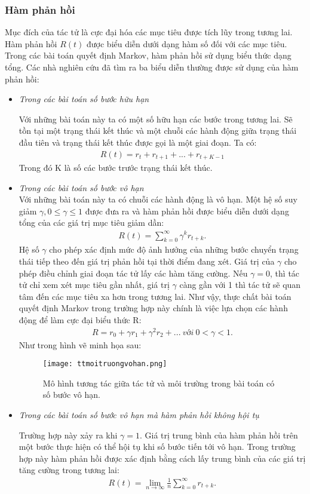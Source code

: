 \subsubsection{Hàm phản hồi}
Mục đích của tác tử là cực đại hóa các mục tiêu được tích lũy trong tương lai. Hàm phản hồi $R(t)$ được biểu diễn dưới dạng hàm số đối với các mục tiêu. Trong các bài toán quyết định Markov, hàm phản hồi sử dụng biểu thức dạng tổng. Các nhà nghiên cứu đã tìm ra ba biểu diễn thường được sử dụng của hàm phản hồi:
\begin{itemize}
\item \textit{Trong các bài toán số bước hữu hạn}

Với những bài toán này ta có một số hữu hạn các bước trong tương lai. Sẽ tồn tại một trạng thái kết thúc và một chuỗi các hành động giữa trạng thái đầu tiên và trạng thái kết thúc được gọi là một giai đoạn.
Ta có:
\begin{align*}
R(t)=r_{t}+r_{t+1}+...+r_{t+K-1}
\end{align*}
	Trong đó K là số các bước trước trạng thái kết thúc.
\item \textit{Trong các bài toán số bước vô hạn}\\
	Với những bài toán này ta có chuỗi các hành động là vô hạn. Một hệ số suy giảm $\gamma,0\leq \gamma \leq 1$ được đưa ra và hàm phản hồi được biểu diễn dưới dạng tổng của các giá trị mục tiêu giảm dần:
\begin{align*}
R(t)= \sum_{k=0}^{\infty} \gamma ^{k} r_{t+k}.
\end{align*}
Hệ số $\gamma$ cho phép xác định mức độ ảnh hưởng của những bước chuyển trạng thái tiếp theo đến giá trị phản hồi tại thời điểm đang xét. Giá trị của $\gamma$ cho phép điều chỉnh giai đoạn tác tử lấy các hàm tăng cường. Nếu $\gamma =0$, thì tác tử chỉ xem xét mục tiêu gần nhất, giá trị $\gamma$ càng gần với 1 thì tác tử sẽ quan tâm đến các mục tiêu xa hơn trong tương lai.
Như vậy, thực chất bài toán quyết định Markov trong trường hợp này chính là việc lựa chọn các hành động để làm cực đại biểu thức R:
\begin{align*}
R=r_{0}+\gamma r_{1}+\gamma^{2}r_{2}+... ~\textit{với}~ 0<\gamma <1.
\end{align*}
	Như trong hình vẽ minh họa sau:\\
	
\begin{figure}[ht]
    \centering
    \texttt{[image: ttmoitruongvohan.png]}
    \caption{Mô hình tương tác giữa tác tử và môi trường trong bài toán có số bước vô hạn.}
    \label{fig:tactumoitruong}
\end{figure}
\newpage
\item \textit{Trong các bài toán số bước vô hạn mà hàm phản hồi không hội tụ}

Trường hợp này xảy ra khi $\gamma = 1$. Giá trị trung bình của hàm phản hồi trên một bước thực hiện có thể hội tụ khi số bước tiến tới vô hạn. Trong trường hợp này hàm phản hồi được xác định bằng cách lấy trung bình của các giá trị tăng cường trong tương lai:
\begin{align*}
R(t)=\lim_{n\rightarrow \infty} \frac{1}{n}\sum_{k=0}^{\infty}r_{t+k}.
\end{align*}
\end{itemize}

